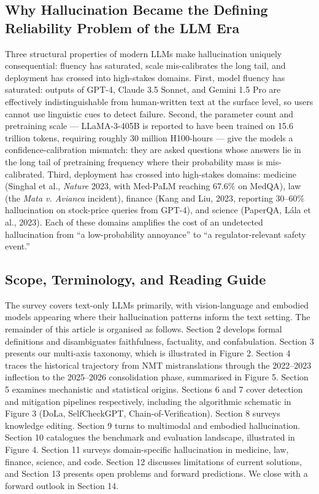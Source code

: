 \documentclass{article}
\begin{document}
\subsection{Why Hallucination Became the Defining Reliability Problem of the LLM Era}\label{why-hallucination-became-the-defining-reliability-problem-of-the-llm-era}

Three structural properties of modern LLMs make hallucination uniquely consequential: fluency has saturated, scale mis-calibrates the long tail, and deployment has crossed into high-stakes domains. First, model fluency has saturated: outputs of GPT-4, Claude 3.5 Sonnet, and Gemini 1.5 Pro are effectively indistinguishable from human-written text at the surface level, so users cannot use linguistic cues to detect failure. Second, the parameter count and pretraining scale --- LLaMA-3-405B is reported to have been trained on 15.6 trillion tokens, requiring roughly 30 million H100-hours --- give the models a confidence-calibration mismatch: they are asked questions whose answers lie in the long tail of pretraining frequency where their probability mass is mis-calibrated. Third, deployment has crossed into high-stakes domains: medicine (Singhal et al., \emph{Nature} 2023, with Med-PaLM reaching 67.6\% on MedQA), law (the \emph{Mata v. Avianca} incident), finance (Kang and Liu, 2023, reporting 30--60\% hallucination on stock-price queries from GPT-4), and science (PaperQA, Lála et al., 2023). Each of these domains amplifies the cost of an undetected hallucination from ``a low-probability annoyance'' to ``a regulator-relevant safety event.''

\subsection{Scope, Terminology, and Reading Guide}\label{scope-terminology-and-reading-guide}

The survey covers text-only LLMs primarily, with vision-language and embodied models appearing where their hallucination patterns inform the text setting. The remainder of this article is organised as follows. Section 2 develops formal definitions and disambiguates faithfulness, factuality, and confabulation. Section 3 presents our multi-axis taxonomy, which is illustrated in Figure 2. Section 4 traces the historical trajectory from NMT mistranslations through the 2022--2023 inflection to the 2025--2026 consolidation phase, summarised in Figure 5. Section 5 examines mechanistic and statistical origins. Sections 6 and 7 cover detection and mitigation pipelines respectively, including the algorithmic schematic in Figure 3 (DoLa, SelfCheckGPT, Chain-of-Verification). Section 8 surveys knowledge editing. Section 9 turns to multimodal and embodied hallucination. Section 10 catalogues the benchmark and evaluation landscape, illustrated in Figure 4. Section 11 surveys domain-specific hallucination in medicine, law, finance, science, and code. Section 12 discusses limitations of current solutions, and Section 13 presents open problems and forward predictions. We close with a forward outlook in Section 14.
\end{document}
